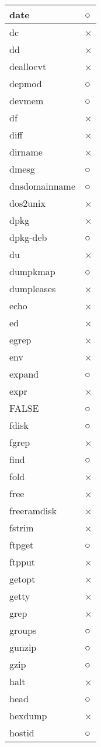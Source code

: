 \begin{longtable}{p{40mm}p{40mm}}
date &  ○ \\ \hline
dc & × \\ \hline
dd & × \\ \hline
deallocvt & × \\ \hline
depmod &  ○ \\ \hline
devmem &  ○ \\ \hline
df & × \\ \hline
diff & × \\ \hline
dirname & × \\ \hline
dmesg & ○ \\ \hline
dnsdomainname & ○ \\ \hline
dos2unix & × \\ \hline
dpkg & × \\ \hline
dpkg-deb &  ○ \\ \hline
du & × \\ \hline
dumpkmap &  ○ \\ \hline
dumpleases & × \\ \hline
echo & × \\ \hline
ed & × \\ \hline
egrep & × \\ \hline
env & × \\ \hline
expand &  ○ \\ \hline
expr & × \\ \hline
FALSE & ○ \\ \hline
fdisk & ○ \\ \hline
fgrep & × \\ \hline
find &  ○ \\ \hline
fold & × \\ \hline
free & × \\ \hline
freeramdisk & × \\ \hline
fstrim & × \\ \hline
ftpget &  ○ \\ \hline
ftpput & × \\ \hline
getopt & × \\ \hline
getty & × \\ \hline
grep & × \\ \hline
groups &  ○ \\ \hline
gunzip &  ○ \\ \hline
gzip &  ○ \\ \hline
halt & × \\ \hline
head &  ○ \\ \hline
hexdump & × \\ \hline
hostid &  ○ \\ \hline

\end{longtable}
